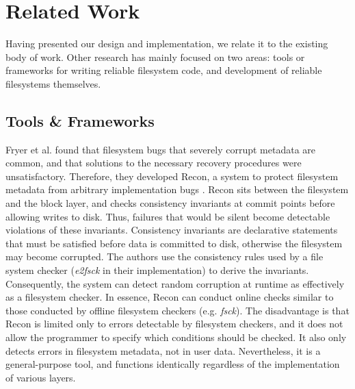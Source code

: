 \section{Related Work} \label{sec:related work}
Having presented our design and implementation, we relate it to the existing body of work.
Other research has mainly focused on two areas: tools or frameworks for writing reliable filesystem code, and development of reliable filesystems themselves.

\subsection{Tools \& Frameworks}\label{subsec:tools frameworks}
Fryer et al. found that filesystem bugs that severely corrupt metadata are common, and that solutions to the necessary recovery procedures were unsatisfactory.
Therefore, they developed Recon, a system to protect filesystem metadata from arbitrary implementation bugs \cite{fryer2012}.
Recon sits between the filesystem and the block layer, and checks consistency invariants at commit points before allowing writes to disk.
Thus, failures that would be silent become detectable violations of these invariants.
Consistency invariants are declarative statements that must be satisfied before data is committed to disk, otherwise the filesystem may become corrupted.
The authors use the consistency rules used by a file system checker (\textit{e2fsck} in their implementation) to derive the invariants.
Consequently, the system can detect random corruption at runtime as effectively as a filesystem checker.
In essence, Recon can conduct online checks similar to those conducted by offline filesystem checkers (e.g. \textit{fsck}).
The disadvantage is that Recon is limited only to errors detectable by filesystem checkers, and it does not allow the programmer to specify which conditions should be checked.
It also only detects errors in filesystem metadata, not in user data.
Nevertheless, it is a general-purpose tool, and functions identically regardless of the implementation of various layers.

